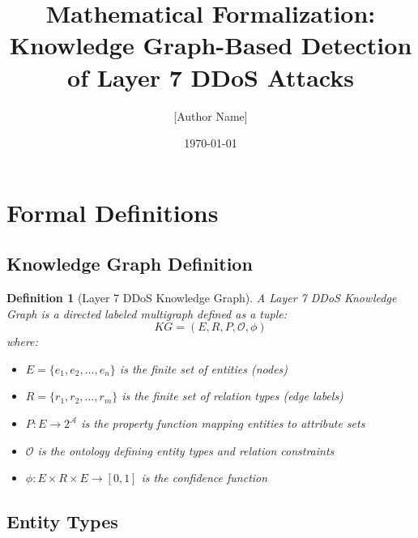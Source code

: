 \documentclass[11pt]{article}
\title{Mathematical Formalization:\\
Knowledge Graph-Based Detection of Layer 7 DDoS Attacks}
\author{[Author Name]}
\date{\today}
\newtheorem{definition}{Definition}
\begin{document}
\maketitle

\section{Formal Definitions}

\subsection{Knowledge Graph Definition}

\begin{definition}[Layer 7 DDoS Knowledge Graph]
A \emph{Layer 7 DDoS Knowledge Graph} is a directed labeled multigraph defined as a tuple:
\begin{equation}
    KG = (E, R, P, \mathcal{O}, \phi)
\end{equation}
where:
\begin{itemize}
    \item $E = \{e_1, e_2, \ldots, e_n\}$ is the finite set of entities (nodes)
    \item $R = \{r_1, r_2, \ldots, r_m\}$ is the finite set of relation types (edge labels)
    \item $P: E \rightarrow 2^{\mathcal{A}}$ is the property function mapping entities to attribute sets
    \item $\mathcal{O}$ is the ontology defining entity types and relation constraints
    \item $\phi: E \times R \times E \rightarrow [0,1]$ is the confidence function
\end{itemize}
\end{definition}

\subsection{Entity Types}
\end{document}
